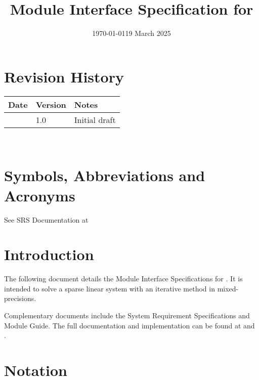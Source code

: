 \documentclass[12pt, titlepage]{article}
\begin{document}
\title{Module Interface Specification for \progname{}}

\author{\authname}

\date{\today}

\maketitle


\section{Revision History}

\begin{tabularx}{\textwidth}{p{3cm}p{2cm}X}
\toprule {\bf Date} & {\bf Version} & {\bf Notes}\\
\midrule
\date{19 March 2025} & 1.0 & Initial draft \\
\bottomrule
\end{tabularx}

~\newpage

\section{Symbols, Abbreviations and Acronyms}

See SRS Documentation at \cite{SRS}

\newpage

\tableofcontents

\newpage


\section{Introduction}

The following document details the Module Interface Specifications for
\progname{}. It is intended to solve a sparse linear system with an iterative
method in mixed-precisions.

Complementary documents include the System Requirement Specifications and Module
Guide. The full documentation and implementation can be found at \cite{SRS} and
\cite{MG}.

\section{Notation}

\end{document}
